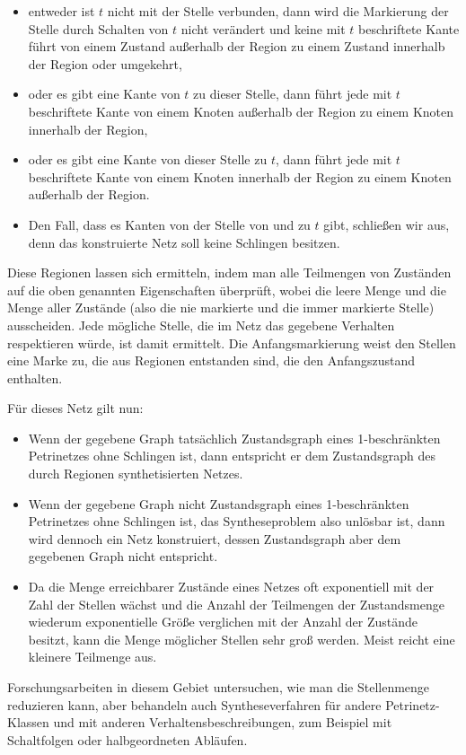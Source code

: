 \vspace{2mm} %

\begin{itemize}
	\item entweder ist $t$ nicht mit der Stelle verbunden, dann wird die Markierung der Stelle durch Schalten von $t$ nicht verändert und keine mit $t$ beschriftete Kante führt von einem Zustand außerhalb der Region zu einem Zustand innerhalb der Region oder umgekehrt,
	\item oder es gibt eine Kante von $t$ zu dieser Stelle, dann führt jede mit $t$ beschriftete Kante von einem Knoten außerhalb der Region zu einem Knoten innerhalb der Region,
	\item oder es gibt eine Kante von dieser Stelle zu $t$, dann führt jede mit $t$ beschriftete Kante von einem Knoten innerhalb der Region zu einem Knoten außerhalb der Region.
	\item Den Fall, dass es Kanten von der Stelle von und zu $t$ gibt, schließen wir aus, denn das konstruierte Netz soll keine Schlingen besitzen.
\end{itemize}

\vspace{2mm} %

Diese Regionen lassen sich ermitteln, indem man alle Teilmengen von Zuständen auf die oben genannten Eigenschaften überprüft, wobei die leere Menge und die Menge aller Zustände (also die nie markierte und die immer markierte Stelle) ausscheiden. Jede mögliche Stelle, die im Netz das gegebene Verhalten respektieren würde, ist damit ermittelt. Die Anfangsmarkierung weist den Stellen eine Marke zu, die aus Regionen entstanden sind, die den Anfangszustand enthalten.

Für dieses Netz gilt nun:

\vspace{2mm} %

\begin{itemize}
	\item Wenn der gegebene Graph tatsächlich Zustandsgraph eines 1-beschränkten Petri\-netzes ohne Schlingen ist, dann entspricht er dem Zustandsgraph des durch Regionen synthetisierten Netzes. 
	\item Wenn der gegebene Graph nicht Zustandsgraph eines 1-beschränkten Petrinetzes ohne Schlingen ist, das Syntheseproblem also unlösbar ist, dann
	wird dennoch ein Netz konstruiert, dessen Zustandsgraph aber dem gegebenen Graph nicht entspricht. 
	\item Da die Menge erreichbarer Zustände eines Netzes oft exponentiell mit der Zahl der Stellen wächst und die Anzahl der Teilmengen der Zustandsmenge wiederum exponentielle Größe verglichen mit der Anzahl der Zustände besitzt, kann die Menge möglicher Stellen sehr groß werden. Meist reicht eine kleinere Teilmenge aus. 
\end{itemize}

\vspace{2mm} %

Forschungsarbeiten in diesem Gebiet untersuchen, wie man die Stellenmenge reduzieren kann, aber behandeln auch Syntheseverfahren für andere Petrinetz-Klassen und mit anderen Verhaltensbeschreibungen, zum Beispiel mit Schaltfolgen oder halbgeordneten Abläufen. 
